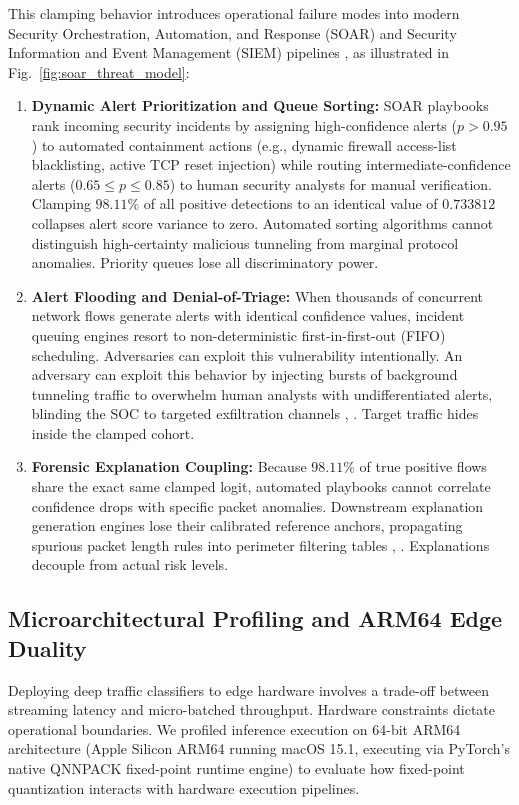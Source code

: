 \documentclass[conference]{IEEEtran}
\begin{document}
This clamping behavior introduces operational failure modes into modern Security Orchestration, Automation, and Response (SOAR) and Security Information and Event Management (SIEM) pipelines \cite{b27}, as illustrated in Fig.~\ref{fig:soar_threat_model}:
\begin{enumerate}
    \item \textbf{Dynamic Alert Prioritization and Queue Sorting:} SOAR playbooks rank incoming security incidents by assigning high-confidence alerts ($p > 0.95$) to automated containment actions (e.g., dynamic firewall access-list blacklisting, active TCP reset injection) while routing intermediate-confidence alerts ($0.65 \le p \le 0.85$) to human security analysts for manual verification. Clamping $98.11\%$ of all positive detections to an identical value of $0.733812$ collapses alert score variance to zero. Automated sorting algorithms cannot distinguish high-certainty malicious tunneling from marginal protocol anomalies. Priority queues lose all discriminatory power.
    \item \textbf{Alert Flooding and Denial-of-Triage:} When thousands of concurrent network flows generate alerts with identical confidence values, incident queuing engines resort to non-deterministic first-in-first-out (FIFO) scheduling. Adversaries can exploit this vulnerability intentionally. An adversary can exploit this behavior by injecting bursts of background tunneling traffic to overwhelm human analysts with undifferentiated alerts, blinding the SOC to targeted exfiltration channels \cite{b28}, \cite{b25}. Target traffic hides inside the clamped cohort.
    \item \textbf{Forensic Explanation Coupling:} Because $98.11\%$ of true positive flows share the exact same clamped logit, automated playbooks cannot correlate confidence drops with specific packet anomalies. Downstream explanation generation engines lose their calibrated reference anchors, propagating spurious packet length rules into perimeter filtering tables \cite{b29}, \cite{b26}. Explanations decouple from actual risk levels.
\end{enumerate}

\subsection{Microarchitectural Profiling and ARM64 Edge Duality}
Deploying deep traffic classifiers to edge hardware involves a trade-off between streaming latency and micro-batched throughput. Hardware constraints dictate operational boundaries. We profiled inference execution on 64-bit ARM64 architecture (Apple Silicon ARM64 running macOS 15.1, executing via PyTorch's native QNNPACK fixed-point runtime engine) to evaluate how fixed-point quantization interacts with hardware execution pipelines.
\end{document}
